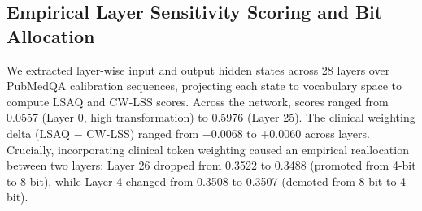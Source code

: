 \documentclass[conference]{IEEEtran}
\begin{document}
\subsection{Empirical Layer Sensitivity Scoring and Bit Allocation}
We extracted layer-wise input and output hidden states across 28 layers over PubMedQA calibration sequences, projecting each state to vocabulary space to compute LSAQ and CW-LSS scores. Across the network, scores ranged from 0.0557 (Layer 0, high transformation) to 0.5976 (Layer 25). The clinical weighting delta (LSAQ $-$ CW-LSS) ranged from $-0.0068$ to $+0.0060$ across layers. Crucially, incorporating clinical token weighting caused an empirical reallocation between two layers: Layer 26 dropped from 0.3522 to 0.3488 (promoted from 4-bit to 8-bit), while Layer 4 changed from 0.3508 to 0.3507 (demoted from 8-bit to 4-bit).
\end{document}

